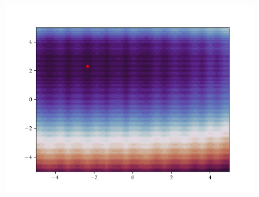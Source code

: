 \begin{figure}[h]
\begin{minipage}[b]{0.32\textwidth}
      \includegraphics[trim=2.5cm 1.3cm 2.5cm 1.3cm,clip,width=\textwidth]{Figures/coco/f3.png}
    \end{minipage}
    

\end{figure}
